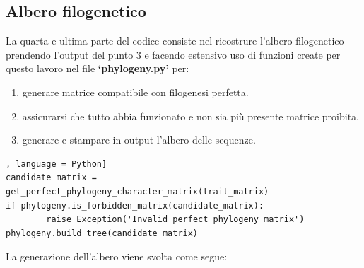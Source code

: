 \documentclass[11pt,italian]{article}
\begin{document}

\subsection{Albero filogenetico}
La quarta e ultima parte del codice consiste nel ricostrure l'albero filogenetico prendendo l'output del punto 3 e facendo estensivo uso di funzioni create per questo lavoro nel file \textbf{`phylogeny.py'} per:
\begin{enumerate}
	\item generare matrice compatibile con filogenesi perfetta.
	\item assicurarsi che tutto abbia funzionato e non sia più presente matrice proibita.
	\item generare e stampare in output l'albero delle sequenze.
\end{enumerate}
\begin{lstlisting}[basicstyle=\small\ttfamily,caption=Porzione di ciclo,label=code:creation table.csv = [], language = Python]
candidate_matrix = get_perfect_phylogeny_character_matrix(trait_matrix)
if phylogeny.is_forbidden_matrix(candidate_matrix):
        raise Exception('Invalid perfect phylogeny matrix')
phylogeny.build_tree(candidate_matrix)
\end{lstlisting}


La generazione dell'albero viene svolta come segue:
	
\end{document}
